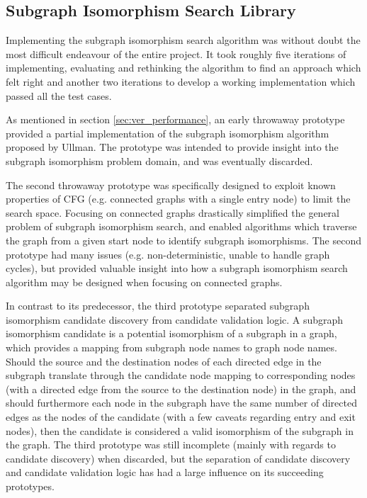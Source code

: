 
\subsection{Subgraph Isomorphism Search Library}
\label{sec:impl_subgraph_isomorphism_search_library}

Implementing the subgraph isomorphism search algorithm was without doubt the most difficult endeavour of the entire project. It took roughly five iterations of implementing, evaluating and rethinking the algorithm to find an approach which felt right and another two iterations to develop a working implementation which passed all the test cases.

As mentioned in section \ref{sec:ver_performance}, an early throwaway prototype provided a partial implementation of the subgraph isomorphism algorithm proposed by Ullman. The prototype was intended to provide insight into the subgraph isomorphism problem domain, and was eventually discarded.

The second throwaway prototype was specifically designed to exploit known properties of CFG (e.g. connected graphs with a single entry node) to limit the search space. Focusing on connected graphs drastically simplified the general problem of subgraph isomorphism search, and enabled algorithms which traverse the graph from a given start node to identify subgraph isomorphisms. The second prototype had many issues (e.g. non-deterministic, unable to handle graph cycles), but provided valuable insight into how a subgraph isomorphism search algorithm may be designed when focusing on connected graphs.

In contrast to its predecessor, the third prototype separated subgraph isomorphism candidate discovery from candidate validation logic. A subgraph isomorphism candidate is a potential isomorphism of a subgraph in a graph, which provides a mapping from subgraph node names to graph node names. Should the source and the destination nodes of each directed edge in the subgraph translate through the candidate node mapping to corresponding nodes (with a directed edge from the source to the destination node) in the graph, and should furthermore each node in the subgraph have the same number of directed edges as the nodes of the candidate (with a few caveats regarding entry and exit nodes), then the candidate is considered a valid isomorphism of the subgraph in the graph. The third prototype was still incomplete (mainly with regards to candidate discovery) when discarded, but the separation of candidate discovery and candidate validation logic has had a large influence on its succeeding prototypes.

